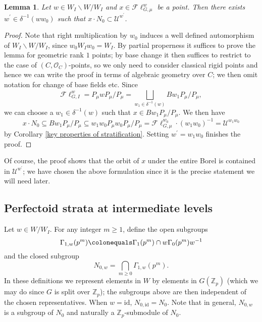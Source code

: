 \documentclass{amsart}
\newtheorem{lemma}[subsubsection]{Lemma}
\theoremstyle{remark}
\numberwithin{equation}{subsection}
\newcommand{\Z}{\ZZ}
\newcommand{\ZZ}{{\mathbb Z}}
\newcommand{\cO}{{\mathcal O}}
\newcommand{\cU}{{\mathcal U}}
\newcommand{\Zp}{\Z_p}
\newcommand{\id}{\mathrm{id}}
\newcommand{\Fl}{\mathscr{F}\!\ell}
\newcommand{\sub}{\subseteq}
\newcommand{\defeq}{\colonequals}
\renewcommand{\(}{\left(}
\renewcommand{\)}{\right)}
\begin{document}
\begin{lemma}\label{finding a J} Let $w\in W_I\backslash W/W_I$ and $x\in \Fl_{G,\mu}^w$ be a point. Then there exists
$w^\prime \in \delta^{-1}(ww_0)$ such that $x \cdot N_0\subset \cU^{w^\prime}$. 
\end{lemma}
\begin{proof}
Note that right multiplication by $w_0$ induces a well defined automorphism of $W_I \backslash W / W_I$, since $w_0 W_I w_0 = W_I$. By partial properness it suffices to prove the lemma for geometric rank $1$ points; by base change it then suffices to restrict to the case of $(C,\cO_{C})$-points, so we only need to consider classical rigid points and hence we can write the proof in terms of algebraic geometry over $C$; we then omit notation for change of base fields etc. Since 
\[
\Fl_{G,I}^{w}=P_{\mu}wP_{\mu}/P_{\mu} = \bigsqcup_{w_1 \in \delta^{-1}(w)} B w_1 P_\mu /P_\mu,
\]
we can choose a $w_1 \in \delta^{-1}(w)$ such that $x\in Bw_{1}P_{\mu}/P_{\mu}$. We then have
\[
x \cdot N_{0} \sub Bw_1P_\mu /P_\mu \sub w_{1}w_{0}P_{\mu}w_{0}P_{\mu}/P_{\mu}=\Fl_{G,\mu}^{w_{0}} \cdot (w_{1}w_{0})^{-1} = \cU^{w_1w_0}
\]
by Corollary \ref{key properties of stratification}. Setting $w^\prime = w_1w_0$ finishes the proof.
\end{proof}

Of course, the proof shows that the orbit of $x$ under the entire Borel is contained in $\cU^{w^\prime}$; we have chosen the above formulation since it is the precise statement we will need later.

\subsection{Perfectoid strata at intermediate levels}\label{perfectoid strata at intermediate levels}
Let $w \in W/W_I$. For any integer $m\geq 1$, define the open subgroups
\[
\Gamma_{1,w}(p^m)\defeq \Gamma_1(p^m) \cap w\Gamma_0(p^m)w^{-1}
\]
and the closed subgroup
\[
 N_{0,w} = \bigcap_{m\geq 0}\Gamma_{1,w}(p^m).
\] 
In these definitions we represent elements in $W$ by elements in $G(\Zp)$ (which we may do since $G$ is split over $\Zp$); the subgroups above are then independent of the chosen representatives. When $w=\id$, $N_{0,\id}=N_{0}$. Note that in general, $N_{0,w}$ is a subgroup of $N_{0}$ and naturally a $\Zp$-submodule of $N_{0}$.
\end{document}

